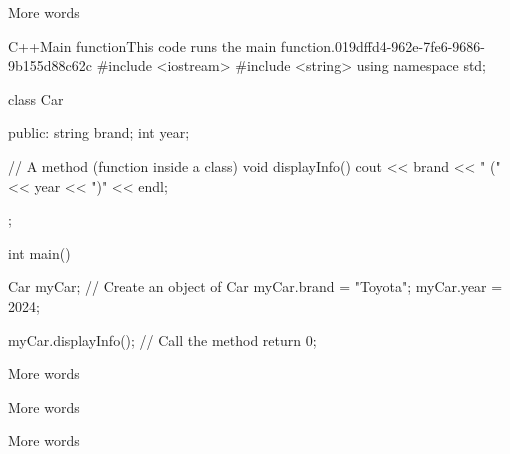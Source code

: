 More words

\begin{notebookcodeblock}{C++}{Main function}{This code runs the main function.}{019dffd4-962e-7fe6-9686-9b155d88c62c}
#include <iostream>
#include <string>
using namespace std;

class Car {
  public:
    string brand;
    int year;

    // A method (function inside a class)
    void displayInfo() {
        cout << brand << " (" << year << ")" << endl;
    }
};

int main() {
    Car myCar; // Create an object of Car
    myCar.brand = "Toyota";
    myCar.year = 2024;
    
    myCar.displayInfo(); // Call the method
    return 0;
}
\end{notebookcodeblock}

More words


More words


More words
